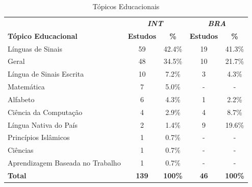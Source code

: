 \begin{table}[htbp]
\caption{Tópicos Educacionais}
\label{results:table:educational-topics}
\centering
\begin{tabular}{lcccc}
\hline
                                 & \multicolumn{2}{c}{\textit{\textbf{INT}}} & \multicolumn{2}{c}{\textit{\textbf{BRA}}} \\ \cline{2-5} 
\textbf{Tópico Educacional}      & \textbf{Estudos}      & \textbf{\%}        & \textbf{Estudos}      & \textbf{\%}        \\ \hline
Línguas de Sinais                & 59                    & 42.4\%             & 19                    & 41.3\%             \\ 
Geral                            & 48                    & 34.5\%             & 10                    & 21.7\%             \\ 
Língua de Sinais Escrita         & 10                    & 7.2\%              & 3                     & 4.3\%              \\ 
Matemática                       & 7                     & 5.0\%              & -                     & -                  \\ 
Alfabeto                         & 6                     & 4.3\%              & 1                     & 2.2\%              \\ 
Ciência da Computação            & 4                     & 2.9\%              & 4                     & 8.7\%              \\ 
Língua Nativa do País            & 2                     & 1.4\%              & 9                     & 19.6\%             \\ 
Princípios Islâmicos             & 1                     & 0.7\%              & -                     & -                  \\ 
Ciências                         & 1                     & 0.7\%              & -                     & -                  \\ 
Aprendizagem Baseada no Trabalho & 1                     & 0.7\%              & -                     & -                  \\ 
\textbf{Total}                   & \textbf{139}          & \textbf{100\%}     & \textbf{46}           & \textbf{100\%}     \\ \hline
\end{tabular}
\fautor
\end{table}

